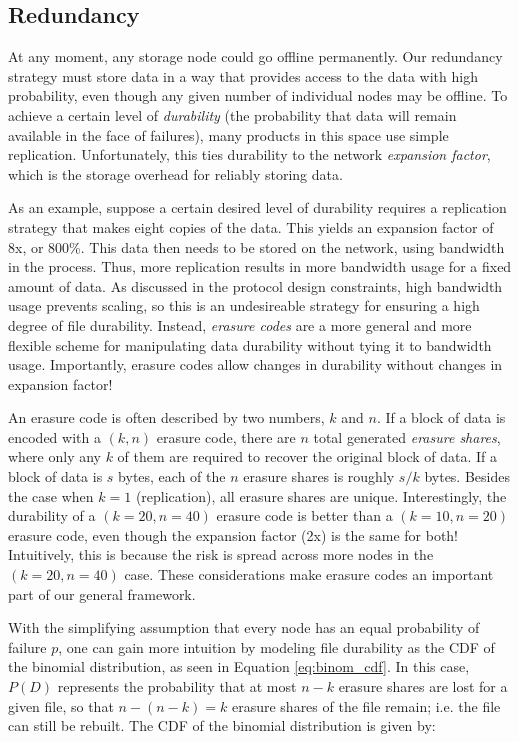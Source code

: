 \documentclass[a4paper,10pt]{article}
\begin{document}
\subsection{Redundancy}

At any moment, any storage node could go offline permanently. Our redundancy
strategy must store data in a way that provides access to the data with high probability, even though any given number of individual nodes may be offline. To achieve a certain level of {\em durability} (the probability that data will remain available in the face of failures), many products in this space use simple replication. Unfortunately, this ties durability to the network {\em expansion factor}, which is the storage overhead for reliably storing data.

As an example, suppose a certain desired level of durability requires a replication strategy that makes eight copies of the data. This yields an expansion factor of 8x, or 800\%. This data then needs to be stored on the network, using bandwidth in the process. Thus, more replication results in more bandwidth usage for a fixed amount of data. As discussed in the protocol design constraints, high bandwidth usage prevents scaling, so this is an undesireable strategy for ensuring a high degree of file durability. Instead, {\em erasure codes} are a more general and more flexible scheme for
manipulating data durability without tying it to bandwidth usage. Importantly, erasure codes allow changes in durability without changes in expansion factor!

An erasure code is often described by two numbers, $k$ and $n$. If a block of
data is encoded with a $(k,n)$ erasure code, there are $n$ total generated
{\em erasure shares}, where only any $k$ of them are required to recover the
original block of data. If a block of data is $s$ bytes, each of the $n$
erasure shares is roughly $s/k$ bytes. Besides the case when $k=1$
(replication), all erasure shares are unique. Interestingly, the durability of a $(k=20,n=40)$ erasure code is better than a $(k=10,n=20)$ erasure code, even though the expansion factor (2x) is the same
for both! Intuitively, this is because the risk is spread across more nodes in
the $(k=20,n=40)$ case. These considerations make erasure codes an important part of our general
framework.

With the simplifying assumption that every node has an equal probability of
failure $p$, one can gain more intuition by modeling file durability as the CDF of the binomial distribution, as seen in Equation \eqref{eq:binom_cdf}. In this case, $P(D)$ represents the probability that at most $n-k$ erasure shares are lost for a given file, so that $n-(n-k)=k$ erasure shares of the file remain; i.e. the file can still be rebuilt. The CDF of the binomial distribution is given by:
\end{document}
